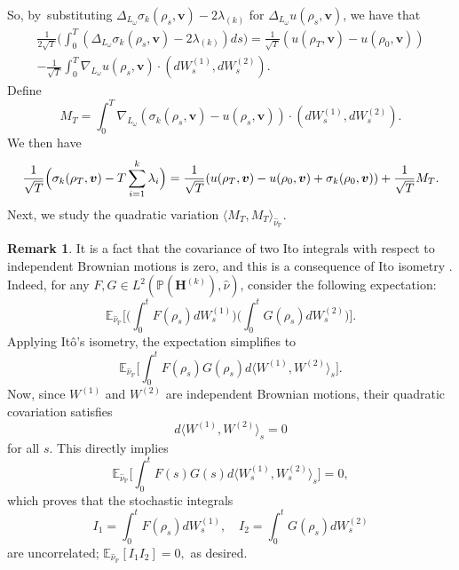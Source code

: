 \documentclass[JEP,XML,SOM,Unicode,published]{cedram}
\theoremstyle{plain}
\theoremstyle{definition}
\newtheorem{rem}[thm]{Remark}
\numberwithin{equation}{subsection}
\newcommand\bE{\mathbb{E}}
\newcommand\bP{\mathbb{P}}
\let\gradient\nabla
\let\laplacian\Delta
\newcommand{\bfH}{\boldsymbol{H}}
\newcommand{\bfv}{\boldsymbol{v}}
\begin{document}
So, by~substituting $\laplacian_{L_\omega} \sigma_k(\rho_s,\bfv)-2\lambda_{(k)}$ for $\laplacian_{L_\omega} u(\rho_s, \bfv)$, we have that\vspace*{-5pt}
\begin{multline*}
\frac{1}{2\sqrt{T}}\biggl(\int_0^T (\laplacian_{L_\omega} \sigma_k(\rho_s,\bfv)-2\lambda_{(k)})ds \biggr) =\frac{1}{\sqrt{T}}(u(\rho_T, \bfv)-u(\rho_0, \bfv)) \\[-5pt]
- \frac{1}{\sqrt{T}}\int_0^T \gradient_{L_\omega} u(\rho_s, \bfv) \cdot (dW^{(1)}_s,dW^{(2)}_s). 
\end{multline*}
Define\vspace*{-3pt}
\begin{equation}
M_T = \int_0^T \gradient_{L_\omega} (\sigma_k(\rho_s,\bfv)-u(\rho_s,\bfv)) \cdot (dW^{(1)}_s,dW^{(2)}_s).\label{itointegralformula}
\end{equation}
We then have\vspace*{-3pt}
\begin{equation}
\frac{1}{\sqrt{T}} \Bigl(\sigma_k(\rho_T,\bfv) - T\sum_{i=1}^k\lambda_i \Bigr) = \frac{1}{\sqrt{T}}(u(\rho_T,\bfv)-u(\rho_0,\bfv) +\sigma_k(\rho_0,\bfv)) + \frac{1}{\sqrt{T}}M_T. \label{M_T_identity}
\end{equation}
Next, we study the quadratic variation $\langle M_T, M_T\rangle_{\hat{\nu}_\bP}$.
\begin{rem} It is a fact that the covariance of two Ito integrals with respect to independent Brownian motions is zero, and this is a consequence of Ito isometry \cite[Th.\,IV.2.2]{RY}. Indeed, for any \(F, G \in L^2(\bP(\bfH^{(k)}), \hat\nu)\), consider the following expectation:\vspace*{-3pt}
\[\textstyle
\bE_{{\hat{\nu}_\bP}} \bigl[ \bigl(\int_0^t F(\rho_s) dW^{(1)}_s \bigr) \bigl(\int_0^t G(\rho_s) dW^{(2)}_s \bigr) \bigr].
\]
Applying Itô’s isometry, the expectation simplifies to
\[\textstyle
\bE_{{\hat{\nu}_\bP}} \bigl[\int_0^t F(\rho_s) G(\rho_s) d\langle W^{(1)}, W^{(2)} \rangle_s \bigr].
\]
Now, since \(W^{(1)} \) and \(W^{(2)} \) are independent Brownian motions, their quadratic covariation satisfies\vspace*{-3pt}
\[
d\langle W^{(1)}, W^{(2)} \rangle_s = 0
\]
for all \(s \). This directly implies
\[\textstyle
\bE_{{\hat{\nu}_\bP}}\bigl[\int_0^t F(s) G(s) d\langle W^{(1)}_s, W^{(2)}_s \rangle_s \bigl] = 0,
\]
which proves that the stochastic integrals
\[
I_1 = \int_0^t F(\rho_s) dW^{(1)}_s, \quad I_2 = \int_0^t G(\rho_s) dW^{(2)}_s
\]
are uncorrelated; \ie \(\bE_{{\hat{\nu}_\bP}}[I_1 I_2] = 0,\) as desired.\end{rem}
\end{document}
